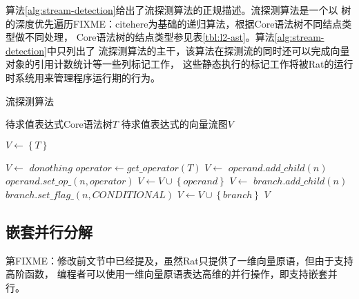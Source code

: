 算法\ref{alg:stream-detection}给出了流探测算法的正规描述。流探测算法是一个以
树的深度优先遍历FIXME：citehere为基础的递归算法，根据Core语法树不同结点类型做不同处理，
Core语法树的结点类型参见表\ref{tbl:l2-ast}。算法\ref{alg:stream-detection}中只列出了
流探测算法的主干，该算法在探测流的同时还可以完成向量对象的引用计数统计等一些列标记工作，
这些静态执行的标记工作将被Rat的运行时系统用来管理程序运行期的行为。
\begin{algorithm}[htbp]
  \caption{流探测算法}
  \label{alg:stream-detection}
  \begin{algorithmic}[1]
    \Require 待求值表达式Core语法树$T$
    \Ensure 待求值表达式的向量流图$V$

      \State $V \leftarrow \left\{ T \right\}$
      \State \Return {}
    \EndFunction

      \State $V \leftarrow$ 
      \State $donothing$
      \State $operator \leftarrow get\_operator(T)$
      \State $V \leftarrow$ 
       {
        \State $operand.add\_child(n)$
        \State $operand.set\_op\_(n, operator)$
        \State $V \leftarrow V \cup \left\{ operand \right\}$
        \EndIf
      }
      \EndFor
      \State $V \leftarrow$ 
       {
        \State $branch.add\_child(n)$
        \State $branch.set\_flag\_(n, CONDITIONAL)$
        \State $V \leftarrow V \cup \left\{ branch \right\}$
        \EndIf
      }
      \EndFor
      \EndIf
      \State \Return $V$
    \EndFunction
  \end{algorithmic}
\end{algorithm}


\subsection{嵌套并行分解}\label{subsec:np-decomposition}
第FIXME：修改前文节中已经提及，虽然Rat只提供了一维向量原语，但由于支持高阶函数，
编程者可以使用一维向量原语表达高维的并行操作，即支持嵌套并行。

